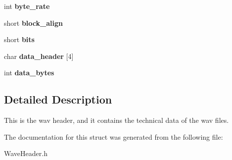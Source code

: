 \begin{DoxyCompactItemize}
int {\bfseries byte\+\_\+rate}
\item 
\mbox{\label{structwav__header_aacca1b77173a063cff26899c8fd614b7}} 
short {\bfseries block\+\_\+align}
\item 
\mbox{\label{structwav__header_a451eecf1447e3b099597004be44f43e3}} 
short {\bfseries bits}
\item 
\mbox{\label{structwav__header_ae43fac12459053e98a80e3879c5cd2a7}} 
char {\bfseries data\+\_\+header} \mbox{[}4\mbox{]}
\item 
\mbox{\label{structwav__header_a3eeeca270947eab7c7aaee61bbee9b0e}} 
int {\bfseries data\+\_\+bytes}
\end{DoxyCompactItemize}


\subsection{Detailed Description}
This is the wav header, and it contains the technical data of the wav files. 

The documentation for this struct was generated from the following file\+:\begin{DoxyCompactItemize}
\item 
Wave\+Header.\+h\end{DoxyCompactItemize}
